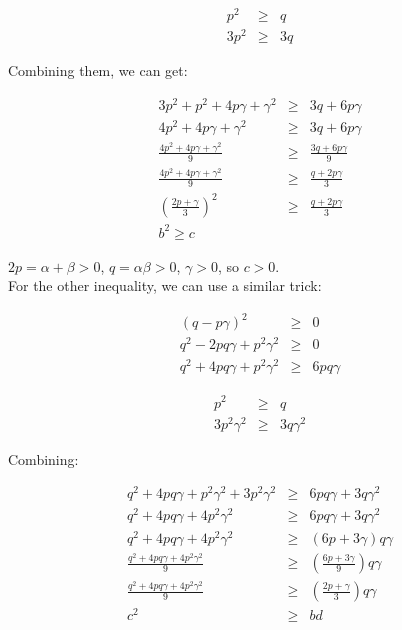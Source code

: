\begin{eqnarray*}
  p^2 &\ge& q \\
  3p^2 &\ge& 3q
\end{eqnarray*}

Combining them, we can get:

\begin{eqnarray*}
  3p^2 + p^2 + 4p\gamma + \gamma^2 &\ge& 3q + 6p\gamma \\
  4p^2 + 4p\gamma + \gamma^2 &\ge& 3q + 6p\gamma \\
  \frac{4p^2 + 4p\gamma + \gamma^2}{9} &\ge& \frac{3q + 6p\gamma}{9} \\
  \frac{4p^2 + 4p\gamma + \gamma^2}{9} &\ge& \frac{q + 2p\gamma}{3} \\
  \left(\frac{2p + \gamma}{3}\right)^2 &\ge& \frac{q + 2p\gamma}{3} \\
  b^2 \ge c
\end{eqnarray*}

$ 2p = \alpha + \beta > 0 $, $ q = \alpha \beta > 0 $, $ \gamma > 0 $, so $ c > 0 $. \\

For the other inequality, we can use a similar trick:

\begin{eqnarray*}
  (q - p\gamma)^2 &\ge& 0 \\
  q^2 - 2pq\gamma + p^2\gamma^2 &\ge& 0 \\
  q^2 + 4pq\gamma + p^2\gamma^2 &\ge& 6pq\gamma 
\end{eqnarray*}

\begin{eqnarray*}
  p^2 &\ge& q \\
  3p^2\gamma^2 &\ge& 3q\gamma^2
\end{eqnarray*}

Combining:

\begin{eqnarray*}
  q^2 + 4pq\gamma + p^2\gamma^2 + 3p^2\gamma^2 &\ge& 6pq\gamma + 3q\gamma^2 \\
  q^2 + 4pq\gamma + 4p^2\gamma^2 &\ge& 6pq\gamma + 3q\gamma^2 \\
  q^2 + 4pq\gamma + 4p^2\gamma^2 &\ge& (6p + 3\gamma)q\gamma \\
  \frac{q^2 + 4pq\gamma + 4p^2\gamma^2}{9} &\ge& \left(\frac{6p + 3\gamma}{9}\right)q\gamma \\
  \frac{q^2 + 4pq\gamma + 4p^2\gamma^2}{9} &\ge& \left(\frac{2p + \gamma}{3}\right) q\gamma \\
  c^2 & \ge & bd 
\end{eqnarray*}

